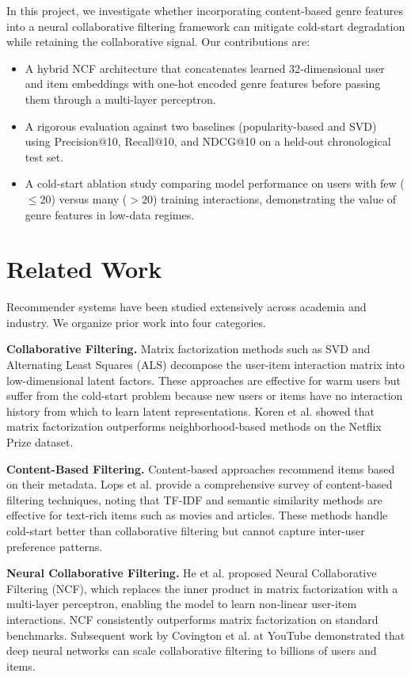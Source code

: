 \documentclass{article}
\begin{document}
In this project, we investigate whether incorporating content-based genre features into a neural collaborative filtering framework can mitigate cold-start degradation while retaining the collaborative signal. Our contributions are:
\begin{itemize}
    \item A hybrid NCF architecture that concatenates learned 32-dimensional user and item embeddings with one-hot encoded genre features before passing them through a multi-layer perceptron.
    \item A rigorous evaluation against two baselines (popularity-based and SVD) using Precision@10, Recall@10, and NDCG@10 on a held-out chronological test set.
    \item A cold-start ablation study comparing model performance on users with few ($\leq 20$) versus many ($> 20$) training interactions, demonstrating the value of genre features in low-data regimes.
\end{itemize}

\section{Related Work}

Recommender systems have been studied extensively across academia and industry. We organize prior work into four categories.

\textbf{Collaborative Filtering.} Matrix factorization methods such as SVD \cite{koren2009matrix} and Alternating Least Squares (ALS) decompose the user-item interaction matrix into low-dimensional latent factors. These approaches are effective for warm users but suffer from the cold-start problem because new users or items have no interaction history from which to learn latent representations. Koren et al. \cite{koren2009matrix} showed that matrix factorization outperforms neighborhood-based methods on the Netflix Prize dataset.

\textbf{Content-Based Filtering.} Content-based approaches recommend items based on their metadata. Lops et al. \cite{lops2011content} provide a comprehensive survey of content-based filtering techniques, noting that TF-IDF and semantic similarity methods are effective for text-rich items such as movies and articles. These methods handle cold-start better than collaborative filtering but cannot capture inter-user preference patterns.

\textbf{Neural Collaborative Filtering.} He et al. \cite{he2017neural} proposed Neural Collaborative Filtering (NCF), which replaces the inner product in matrix factorization with a multi-layer perceptron, enabling the model to learn non-linear user-item interactions. NCF consistently outperforms matrix factorization on standard benchmarks. Subsequent work by Covington et al. \cite{covington2016deep} at YouTube demonstrated that deep neural networks can scale collaborative filtering to billions of users and items.
\end{document}
